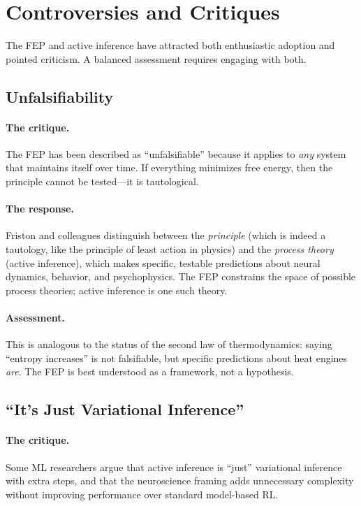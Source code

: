 \documentclass[11pt,a4paper]{article}
\theoremstyle{definition}
\begin{document}
\section{Controversies and Critiques}
\label{sec:controversies}

The FEP and active inference have attracted both enthusiastic adoption and
pointed criticism.  A balanced assessment requires engaging with both.

\subsection{Unfalsifiability}

\paragraph{The critique.}
The FEP has been described as ``unfalsifiable'' because it applies to
\emph{any} system that maintains itself over time.  If everything minimizes
free energy, then the principle cannot be tested---it is tautological.

\paragraph{The response.}
Friston and colleagues distinguish between the \emph{principle} (which is
indeed a tautology, like the principle of least action in physics) and the
\emph{process theory} (active inference), which makes specific, testable
predictions about neural dynamics, behavior, and psychophysics.  The FEP
constrains the space of possible process theories; active inference is one
such theory.

\paragraph{Assessment.}
This is analogous to the status of the second law of thermodynamics: saying
``entropy increases'' is not falsifiable, but specific predictions about heat
engines \emph{are}.  The FEP is best understood as a framework, not a
hypothesis.

\subsection{``It's Just Variational Inference''}

\paragraph{The critique.}
Some ML researchers argue that active inference is ``just'' variational
inference with extra steps, and that the neuroscience framing adds unnecessary
complexity without improving performance over standard model-based RL.
\end{document}
